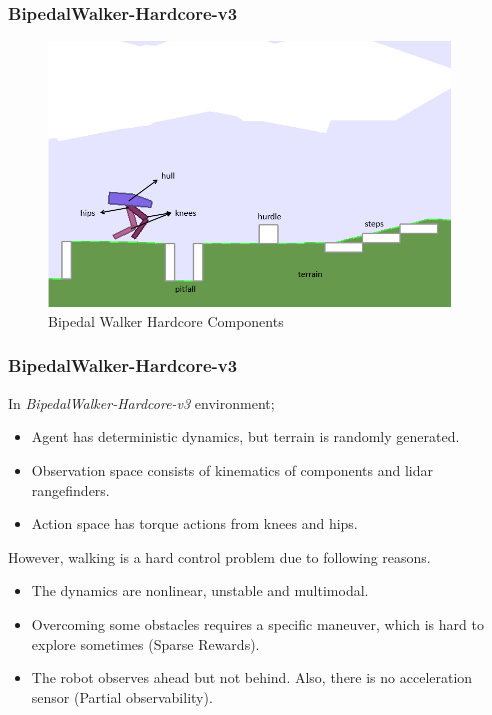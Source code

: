 \documentclass{beamer}
\begin{document}
\begin{frame}
\frametitle{BipedalWalker-Hardcore-v3}
\begin{figure}
	\centering
	\includegraphics[width=0.95\textwidth]{figures/bipedal/bpedal_annotated.png}
	\caption{Bipedal Walker Hardcore Components~\cite{noauthor_bipedalwalkerhardcore-v2_2021}}
	\label{fig:bipedal_hardcore_components}
\end{figure}
\end{frame}

\begin{frame}
\frametitle{BipedalWalker-Hardcore-v3}
In \textit{BipedalWalker-Hardcore-v3} environment;
\begin{itemize}
	\item Agent has deterministic dynamics, but terrain is randomly generated.
	\item Observation space consists of kinematics of components and lidar rangefinders.
	\item Action space has torque actions from knees and hips.
\end{itemize}
However, walking is a hard control problem due to following reasons.
\begin{itemize}
	\item The dynamics are nonlinear, unstable and multimodal. 
	\item Overcoming some obstacles requires a specific maneuver, which is hard to explore sometimes (Sparse Rewards).
	\item The robot observes ahead but not behind. Also, there is no acceleration sensor (Partial observability).
\end{itemize}
\end{frame}
\end{document}
